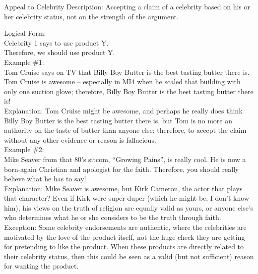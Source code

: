 \documentclass[a4paper,12pt,single,pdftex]{scrbook}
\begin{document}
Appeal to Celebrity
    Description: Accepting a claim of a celebrity based on his or her celebrity status, not on the strength of the argument.

    
      Logical Form:
    \\

    
      Celebrity 1 says to use product Y.
    \\

    
      Therefore, we should use product Y.
    \\

    
      Example \#1:
    \\

    
      Tom Cruise says on TV that Billy Boy Butter is the best tasting butter there is.  Tom Cruise is awesome -- especially in MI4 when he scaled that building with only one suction glove; therefore, Billy Boy Butter is the best tasting butter there is!
    \\

    
      Explanation: Tom Cruise might be awesome, and perhaps he really does think Billy Boy Butter is the best tasting butter there is, but Tom is no more an authority on the taste of butter than anyone else; therefore, to accept the claim without any other evidence or reason is fallacious.
    \\

    
      Example \#2:
    \\

    
      Mike Seaver from that 80’s sitcom, “Growing Pains”, is really cool.  He is now a born-again Christian and apologist for the faith.  Therefore, you should really believe what he has to say!
    \\

    
      Explanation: Mike Seaver is awesome, but Kirk Cameron, the actor that plays that character?  Even if Kirk were super duper (which he might be, I don’t know him), his views on the truth of religion are equally valid as yours, or anyone else's who determines what he or she considers to be the truth through faith.
    \\

    
      Exception: Some celebrity endorsements are authentic, where the celebrities are motivated by the love of the product itself, not the huge check they are getting for pretending to like the product.  When these products are directly related to their celebrity status, then this could be seen as a valid (but not sufficient) reason for wanting the product.
    \\
\end{document}
